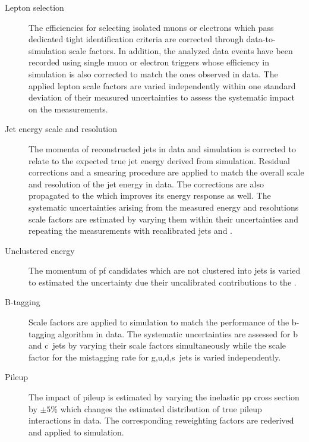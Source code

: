 \begin{description}
\item[Lepton selection] The efficiencies for selecting isolated muons or electrons which pass dedicated tight identification criteria are corrected through data-to-simulation scale factors. In addition, the analyzed data events have been recorded using single muon or electron triggers whose efficiency in simulation is also corrected to match the ones observed in data. The applied lepton scale factors are varied independently within one standard deviation of their measured uncertainties to assess the systematic impact on the measurements.
\item[Jet energy scale and resolution] The momenta of reconstructed jets in data and simulation is corrected to relate to the expected true jet energy derived from simulation. Residual corrections and a smearing procedure are applied to match the overall scale and resolution of the jet energy in data. The corrections are also propagated to the \met which improves its energy response as well. The systematic uncertainties arising from the measured energy and resolutions scale factors are estimated by varying them within their uncertainties and repeating the measurements with recalibrated jets and \met.
\item[Unclustered energy] The momentum of \gls{pf} candidates which are not clustered into jets is varied to estimated the uncertainty due their uncalibrated contributions to the \met.
\item[B-tagging] Scale factors are applied to simulation to match the performance of the b-tagging algorithm in data. The systematic uncertainties are assessed for b and c~jets by varying their scale factors simultaneously while the scale factor for the mistagging rate for g,u,d,s~jets is varied independently.
\item[Pileup] The impact of pileup is estimated by varying the inelastic pp cross section by $\pm5\%$ which changes the estimated distribution of true pileup interactions in data. The corresponding reweighting factors are rederived and applied to simulation.
\end{description}

